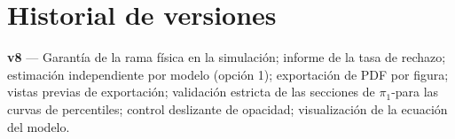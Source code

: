 \documentclass[11pt,a4paper]{article}
\newcommand{\pio}{\ensuremath{\pi_1}}
\begin{document}
\section*{Historial de versiones}

\textbf{v8} --- Garantía de la rama física en la simulación; informe de la tasa de rechazo; estimación independiente por modelo (opción 1); exportación de PDF por figura; vistas previas de exportación; validación estricta de las secciones de $\pio$-para las curvas de percentiles; control deslizante de opacidad; visualización de la ecuación del modelo.
\end{document}
